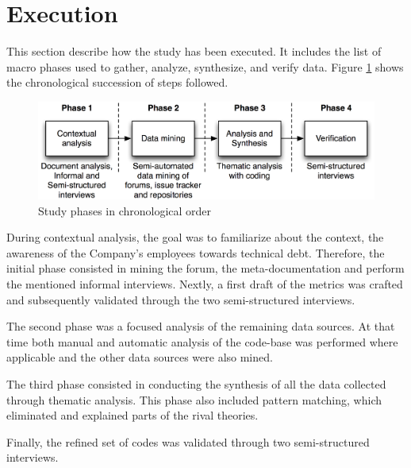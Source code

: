 \section{Execution}
This section describe how the study has been executed. It includes the list of macro phases used to gather, analyze, synthesize, and verify data.
Figure \ref{fig:study-phases} shows the chronological succession of steps followed.

\begin{figure}[hbt]
    \centering
    \includegraphics[width=\textwidth]{figure/methods/steps.png}
    \caption{Study phases in chronological order}
    \label{fig:study-phases}
\end{figure}

During contextual analysis, the goal was to familiarize about the context, the awareness of the Company's employees towards technical debt.
Therefore, the initial phase consisted in mining the forum, the meta-documentation and perform the mentioned informal interviews. Nextly, a first draft of the metrics was crafted and subsequently validated through the two semi-structured interviews.

The second phase was a focused analysis of the remaining data sources. At that time both manual and automatic analysis of the code-base was performed where applicable and the other data sources were also mined.

The third phase consisted in conducting the synthesis of all the data collected through thematic analysis. This phase also included pattern matching, which eliminated and explained parts of the rival theories.

Finally, the refined set of codes was validated through two semi-structured interviews.
